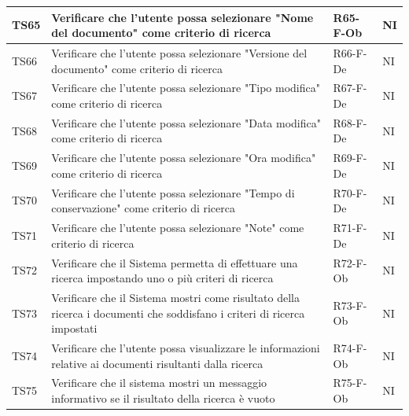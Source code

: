 \documentclass[a4paper,12pt]{article}
\begin{document}
\begin{longtable}{|M{1.2cm}|M{6.3cm}|M{2.5cm}|M{1.5cm}|}
                TS65 & Verificare che l'utente possa selezionare "Nome del documento" come criterio di ricerca & R65-F-Ob & NI \\
                \hline

                TS66 & Verificare che l'utente possa selezionare "Versione del documento" come criterio di ricerca & R66-F-De & NI \\
                \hline

                TS67 & Verificare che l'utente possa selezionare "Tipo modifica" come criterio di ricerca & R67-F-De & NI \\
                \hline

                TS68 & Verificare che l'utente possa selezionare "Data modifica" come criterio di ricerca & R68-F-De & NI \\
                \hline

                TS69 & Verificare che l'utente possa selezionare "Ora modifica" come criterio di ricerca & R69-F-De & NI \\
                \hline

                TS70 & Verificare che l'utente possa selezionare "Tempo di conservazione" come criterio di ricerca & R70-F-De & NI \\
                \hline

                TS71 & Verificare che l'utente possa selezionare "Note" come criterio di ricerca & R71-F-De & NI \\
                \hline

                TS72 & Verificare che il Sistema permetta di effettuare una ricerca impostando uno o più criteri di ricerca & R72-F-Ob & NI \\
                \hline

                TS73 & Verificare che il Sistema mostri come risultato della ricerca i documenti che soddisfano i criteri di ricerca impostati & R73-F-Ob & NI \\
                \hline

                TS74 & Verificare che l'utente possa visualizzare le informazioni relative ai documenti risultanti dalla ricerca & R74-F-Ob & NI \\
                \hline

                TS75 & Verificare che il sistema mostri un messaggio informativo se il risultato della ricerca è vuoto & R75-F-Ob & NI \\
                \hline


\end{longtable}
\end{document}
